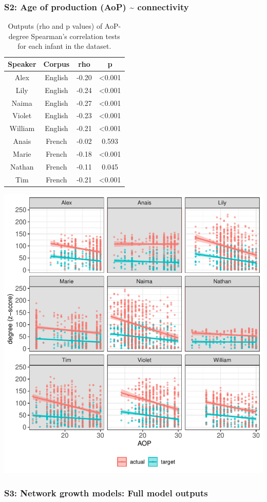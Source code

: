 \documentclass[
]{article}
\begin{document}
\hypertarget{s2-age-of-production-aop-connectivity}{%
\subsubsection{S2: Age of production (AoP) \textasciitilde{}
connectivity}\label{s2-age-of-production-aop-connectivity}}

\begin{longtable}[t]{cccc}
\caption{\label{tab:table-aop-deg-corr}Outputs (rho and p values) of AoP-degree Spearman's correlation tests for each infant in the dataset.}\\
\toprule
Speaker & Corpus & rho & p\\
\midrule
Alex & English & -0.20 & <0.001\\
Lily & English & -0.24 & <0.001\\
Naima & English & -0.27 & <0.001\\
Violet & English & -0.23 & <0.001\\
William & English & -0.21 & <0.001\\
\addlinespace
Anais & French & -0.02 & 0.593\\
Marie & French & -0.18 & <0.001\\
Nathan & French & -0.11 & 0.045\\
Tim & French & -0.21 & <0.001\\
\bottomrule
\end{longtable}

\includegraphics{PhonNetworksSupplementaryData_files/figure-latex/Figure-AOP-deg-corr-1.pdf}

\newpage

\hypertarget{s3-network-growth-models-full-model-outputs}{%
\subsubsection{S3: Network growth models: Full model
outputs}\label{s3-network-growth-models-full-model-outputs}}
\end{document}

